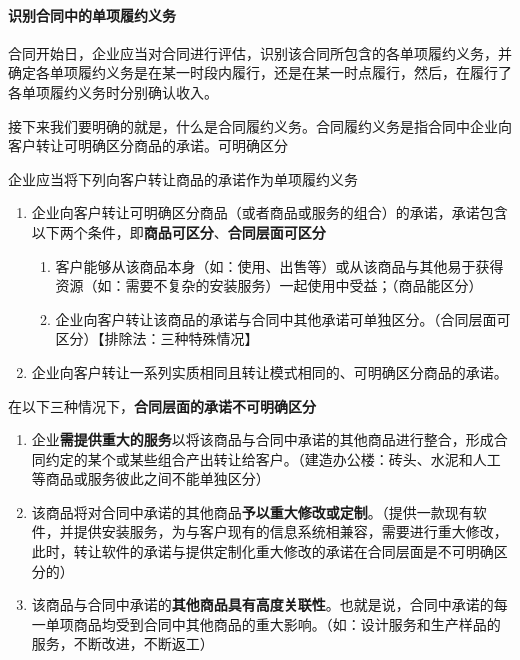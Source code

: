 \documentclass[UTF8,12pt]{ctexart}
\numberwithin{equation}{section} %
\numberwithin{figure}{section}
\numberwithin{table}{section}
\begin{document}
	\paragraph{识别合同中的单项履约义务}
	合同开始日，企业应当对合同进行评估，识别该合同所包含的各单项履约义务，并确定各单项履约义务是在某一时段内履行，还是在某一时点履行，然后，在履行了各单项履约义务时分别确认收入。
	
	接下来我们要明确的就是，什么是合同履约义务。合同履约义务是指合同中企业向客户转让可明确区分商品的承诺。可明确区分
	
	企业应当将下列向客户转让商品的承诺作为单项履约义务
	\begin{enumerate}
		\item 企业向客户转让可明确区分商品（或者商品或服务的组合）的承诺，承诺包含以下两个条件，即\textbf{商品可区分}、\textbf{合同层面可区分}
		\begin{enumerate}
			\item 客户能够从该商品本身（如：使用、出售等）或从该商品与其他易于获得资源（如：需要不复杂的安装服务）一起使用中受益；（商品能区分）
			
			\item 企业向客户转让该商品的承诺与合同中其他承诺可单独区分。（合同层面可区分）【排除法：三种特殊情况】
		\end{enumerate}
		
		\item 企业向客户转让一系列实质相同且转让模式相同的、可明确区分商品的承诺。
	\end{enumerate}

	在以下三种情况下，\textbf{合同层面的承诺不可明确区分}
	\begin{enumerate}
		\item 企业\textbf{需提供重大的服务}以将该商品与合同中承诺的其他商品进行整合，形成合同约定的某个或某些组合产出转让给客户。（建造办公楼：砖头、水泥和人工等商品或服务彼此之间不能单独区分）
		
		\item 该商品将对合同中承诺的其他商品\textbf{予以重大修改或定制}。（提供一款现有软件，并提供安装服务，为与客户现有的信息系统相兼容，需要进行重大修改，此时，转让软件的承诺与提供定制化重大修改的承诺在合同层面是不可明确区分的）
		
		\item 该商品与合同中承诺的\textbf{其他商品具有高度关联性}。也就是说，合同中承诺的每一单项商品均受到合同中其他商品的重大影响。（如：设计服务和生产样品的服务，不断改进，不断返工）
		
	\end{enumerate}
\end{document}

